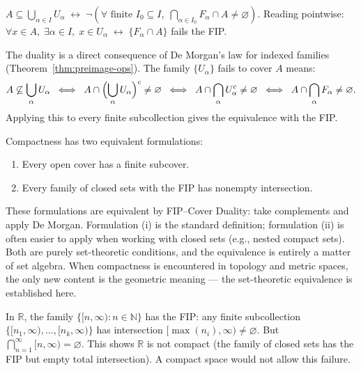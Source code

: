 \begin{remark*}
$A \subseteq \bigcup_{\alpha \in I} U_\alpha \;\leftrightarrow\; \neg(\forall\text{ finite }I_0\subseteq I,\; \bigcap_{\alpha\in I_0} F_\alpha \cap A \neq \varnothing)$. Reading pointwise: $\forall x\in A,\;\exists\alpha\in I,\; x\in U_\alpha \;\leftrightarrow\; \{F_\alpha\cap A\}$ fails the FIP.
\end{remark*}


\begin{remark*}
The duality is a direct consequence of De Morgan's law for indexed families
(Theorem~\ref{thm:preimage-ops}). The family $\{U_\alpha\}$ fails to cover
$A$ means:
\[
A \not\subseteq \bigcup_\alpha U_\alpha
\;\;\Longleftrightarrow\;\;
A \cap \Bigl(\bigcup_\alpha U_\alpha\Bigr)^c \neq \varnothing
\;\;\Longleftrightarrow\;\;
A \cap \bigcap_\alpha U_\alpha^c \neq \varnothing
\;\;\Longleftrightarrow\;\;
A \cap \bigcap_\alpha F_\alpha \neq \varnothing.
\]
Applying this to every finite subcollection gives the equivalence with the FIP.
\end{remark*}

\begin{remark*}
Compactness has two equivalent formulations:
\begin{enumerate}[label=(\roman*)]
\item Every open cover has a finite subcover.
\item Every family of closed sets with the FIP has nonempty intersection.
\end{enumerate}
These formulations are equivalent by FIP--Cover Duality: take complements and
apply De Morgan. Formulation (i) is the standard definition; formulation (ii)
is often easier to apply when working with closed sets (e.g., nested compact
sets). Both are purely set-theoretic conditions, and the equivalence is
entirely a matter of set algebra. When compactness is encountered in topology
and metric spaces, the only new content is the geometric meaning — the
set-theoretic equivalence is established here.
\end{remark*}

\begin{example*}
In $\mathbb{R}$, the family $\{[n, \infty) : n \in \mathbb{N}\}$ has the FIP:
any finite subcollection $\{[n_1,\infty), \dots, [n_k,\infty)\}$ has
intersection $[\max(n_i), \infty) \neq \varnothing$. But
$\bigcap_{n=1}^\infty [n, \infty) = \varnothing$. This shows $\mathbb{R}$ is
not compact (the family of closed sets has the FIP but empty total
intersection). A compact space would not allow this failure.
\end{example*}
